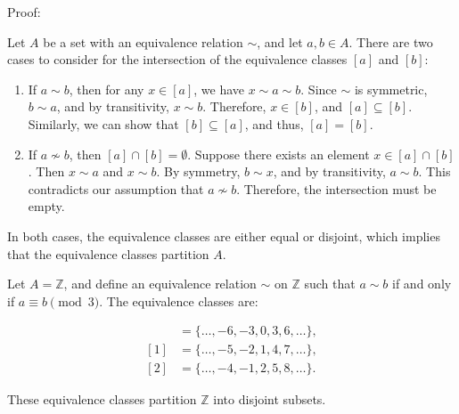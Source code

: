 Proof:

Let $A$ be a set with an equivalence relation $\sim$, and let $a, b \in A$. There are two cases to consider for the intersection of the equivalence classes $[a]$ and $[b]$:


\begin{enumerate}

\item If $a \sim b$, then for any $x \in [a]$, we have $x \sim a \sim b$. Since $\sim$ is symmetric, $b \sim a$, and by transitivity, $x \sim b$. Therefore, $x \in [b]$, and $[a] \subseteq [b]$. Similarly, we can show that $[b] \subseteq [a]$, and thus, $[a] = [b]$.

\item If $a \not\sim b$, then $[a] \cap [b] = \emptyset$. Suppose there exists an element $x \in [a] \cap [b]$. Then $x \sim a$ and $x \sim b$. By symmetry, $b \sim x$, and by transitivity, $a \sim b$. This contradicts our assumption that $a \not \sim b$. Therefore, the intersection must be empty.

\end{enumerate}

In both cases, the equivalence classes are either equal or disjoint, which implies that the equivalence classes partition $A$.

\begin{example}
Let $A = \mathbb{Z}$, and define an equivalence relation $\sim$ on $\mathbb{Z}$ such that $a \sim b$ if and only if $a \equiv b \pmod{3}$. The equivalence classes are:

\begin{align*}
[0] &= \{\dots, -6, -3, 0, 3, 6, \dots\}, \\
[1] &= \{\dots, -5, -2, 1, 4, 7, \dots\}, \\
[2] &= \{\dots, -4, -1, 2, 5, 8, \dots\}.
\end{align*}

These equivalence classes partition $\mathbb{Z}$ into disjoint subsets.
\end{example}



